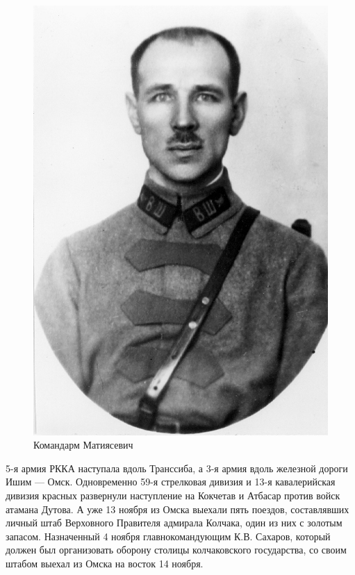 \begin{figure}[h!tb] 
	\centering\includegraphics[scale=0.7]{Glava6/IWdsdZ-_1jk.jpg}
	\caption{Командарм Матиясевич}%
\end{figure}

5-я армия РККА наступала вдоль Транссиба, а 3-я армия вдоль железной дороги Ишим — Омск. Одновременно 59-я стрелковая дивизия и 13-я кавалерийская дивизия красных развернули наступление на Кокчетав и Атбасар против войск атамана Дутова. А уже 13 ноября из Омска выехали пять поездов, составлявших личный штаб Верховного Правителя адмирала Колчака, один из них с золотым запасом. Назначенный 4 ноября главнокомандующим К.В. Сахаров, который должен был организовать оборону столицы колчаковского государства, со своим штабом выехал из Омска на восток 14 ноября.

